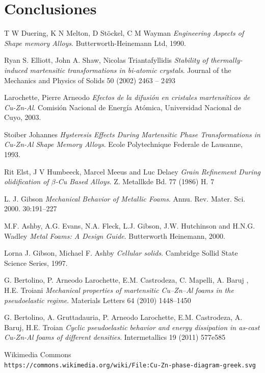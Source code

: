\documentclass[a4paper,12pt,fleqn,twoside,openany]{book}
\begin{document}


\chapter{Conclusiones}


\begin{thebibliography}{3}

T W Duering, K N Melton, D St{\"o}ckel, C M Wayman 
\textit{Engineering Aspects of Shape memory Alloys}. 
Butterworth-Heinemann Ltd, 1990.
 
Ryan S. Elliott, John A. Shaw, Nicolas Triantafyllidis
\textit{Stability of thermally-induced martensitic
transformations in bi-atomic crystals}.
Journal of the Mechanics and Physics of Solids
50 (2002) 2463 – 2493

Larochette, Pierre Arneodo 
\textit{Efectos de la difusión en cristales martensíticos de Cu-Zn-Al}. 
Comisión Nacional de Energía Atómica, Universidad Nacional de Cuyo, 2003.

Stoiber Johannes 
\textit{Hysteresis Effects During Martensitic Phase Transformations in Cu-Zn-Al Shape Memory Alloys}. 
Ecole Polytechnique Federale de Lausanne, 1993.

Rit Elst, J V Humbeeck, Marcel Meeus and Luc Delaey
\textit{Grain Refinement During olidification of $\beta$-Cu Based Alloys}.
Z. Metallkde Bd. 77 (1986) H. 7

L. J. Gibson
\textit{Mechanical Behavior of Metallic Foams}.
Annu. Rev. Mater. Sci. 2000. 30:191–227

M.F. Ashby, A.G. Evans, N.A. Fleck, L.J. Gibson,
J.W. Hutchinson and H.N.G. Wadley
\textit{Metal Foams: A Design Guide}. 
Butterworth Heinemann, 2000.


Lorna J. Gibson, Michael F. Ashby  
\textit{Cellular solids}. 
Cambridge Sollid State Science Series, 1997.

G. Bertolino, P. Arneodo Larochette, E.M. Castrodeza, C. Mapelli, A. Baruj , H.E. Troiani
\textit{Mechanical properties of martensitic Cu–Zn–Al foams in the pseudoelastic regime}.
Materials Letters 64 (2010) 1448–1450

G. Bertolino, A. Gruttadauria, P. Arneodo Larochette, E.M. Castrodeza, A. Baruj, H.E. Troian
\textit{Cyclic pseudoelastic behavior and energy dissipation in as-cast Cu-Zn-Al foams of
different densities}.
Intermetallics 19 (2011) 577e585

Wikimedia Commons
\\\texttt{https://commons.wikimedia.org/wiki/File:Cu-Zn-phase-diagram-greek.svg}
\end{thebibliography}
\end{document}
